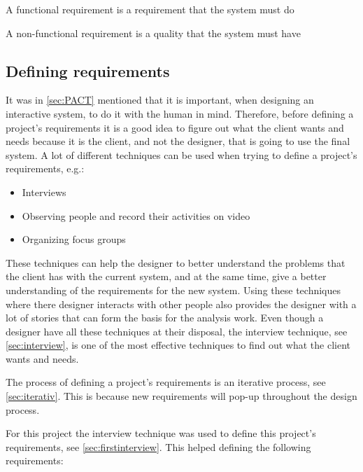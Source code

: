 \begin{defn}
A functional requirement is a requirement that the system must do
\end{defn}

\begin{defn}
A non-functional requirement is a quality that the system must have
\end{defn}

\subsection{Defining requirements}
It was in \cref{sec:PACT} mentioned that it is important, when designing an interactive system, to do it with the human in mind.
Therefore, before defining a project's requirements it is a good idea to figure out what the client wants and needs because it is the client, and not the designer, that is going to use the final system.
A lot of different techniques can be used when trying to define a project's requirements, e.g.:

\begin{itemize}
        \item Interviews
        \item Observing people and record their activities on video
        \item Organizing focus groups
\end{itemize}

These techniques can help the designer to better understand the problems that the client has with the current system, and at the same time, give a better understanding of the requirements for the new system.
Using these techniques where there designer interacts with other people also provides the designer with a lot of stories that can form the basis for the analysis work. Even though a designer have all these techniques at their disposal, the interview technique, see \cref{sec:interview}, is one of the most effective techniques to find out what the client wants and needs.

The process of defining a project's requirements is an iterative process, see \cref{sec:iterativ}. This is because new requirements will pop-up throughout the design process.

For this project the interview technique was used to define this project's requirements, see \cref{sec:firstinterview}. This helped defining the following requirements:

